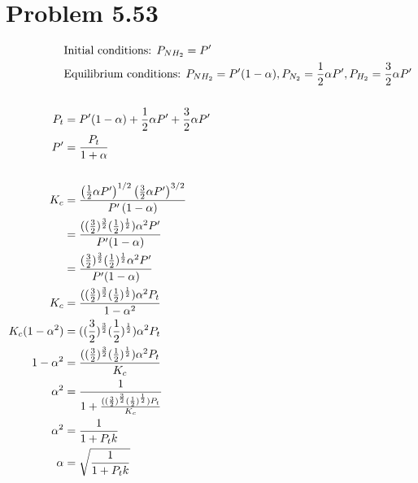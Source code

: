 \documentclass[10pt]{article} %
\begin{document}
\section{Problem 5.53}
\begin{align*}
  &\mbox{Initial conditions: } P_{NH_2} = P'\\
  &\mbox{Equilibrium conditions: } P_{NH_2} = P'(1-\alpha), P_{N_2} = \frac{1}{2}\alpha P', P_{H_2} = \frac{3}{2}\alpha P'\\
  \vspace{1cm}\\
  P_t &= P'(1-\alpha) + \frac{1}{2}\alpha P' + \frac{3}{2}\alpha P'\\
  P' &= \frac{P_t}{1+\alpha}\\
  \vspace{1cm}\\
  K_c &= \frac{\left(\frac{1}{2}\alpha P'\right)^{1/2}\left(\frac{3}{2}\alpha P'\right)^{3/2}}{P'\left(1-\alpha\right)}\\
  &= \frac{((\frac{3}{2})^\frac{3}{2}(\frac{1}{2})^\frac{1}{2})\alpha^2 P'}{P'(1-\alpha)}\\
  &= \frac{(\frac{3}{2})^\frac{3}{2}(\frac{1}{2})^\frac{1}{2}\alpha^2 P'}{P'(1-\alpha)}\\
  K_c &= \frac{((\frac{3}{2})^\frac{3}{2}(\frac{1}{2})^\frac{1}{2})\alpha^2 P_t}{1-\alpha^2}\\
  K_c(1-\alpha^2) &= ((\frac{3}{2})^\frac{3}{2}(\frac{1}{2})^\frac{1}{2})\alpha^2P_t\\
  1-\alpha^2 &= \frac{((\frac{3}{2})^\frac{3}{2}(\frac{1}{2})^\frac{1}{2})\alpha^2P_t}{K_c}\\
  \alpha^2 &= \frac{1}{1+\frac{((\frac{3}{2})^\frac{3}{2}(\frac{1}{2})^\frac{1}{2})P_t}{K_c}}\\
  \alpha^2 &= \frac{1}{1+P_tk}\\
  \alpha &= \sqrt{\frac{1}{1+P_tk}}\\
\end{align*}
\end{document}
